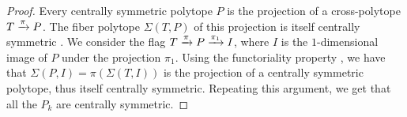 \begin{proof}
	Every centrally symmetric polytope $P$ is the projection of a cross-polytope $T \xrightarrow{\pi} P$.
	The fiber polytope $\Sigma(T,P)$ of this projection is itself centrally symmetric \cite[Theorem 5.1]{BilleraSturmfels92}.
	We consider the flag $T \xrightarrow{\pi} P \xrightarrow{\pi_1} I$, where $I$ is the $1$-dimensional image of $P$ under the projection $\pi_1$.
	Using the functoriality property \cite[Lemma 2.3]{BilleraSturmfels92}, we have that $\Sigma(P,I)=\pi(\Sigma(T,I))$ is the projection of a centrally symmetric polytope, thus itself centrally symmetric.
	Repeating this argument, we get that all the $P_k$ are centrally symmetric.
\end{proof}

